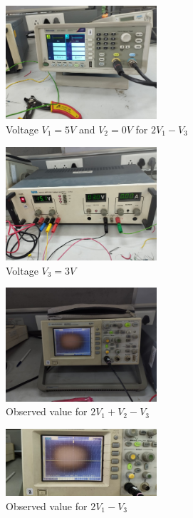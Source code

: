 \documentclass[a4paper,12pt]{article}
\begin{document}
\begin{figure}[H]
    \centering
    \includegraphics[width=0.5\textwidth]{figs/adderv1.png}
    \caption{Voltage $V_1 = 5V$ and $V_2 = 0V$ for $2V_1 - V_3$}
\end{figure}
\begin{figure}[H]
    \centering
    \includegraphics[width=0.5\textwidth]{figs/adderv3.png}
    \caption{Voltage $V_3 = 3V$}
\end{figure}

\begin{figure}[H]
    \centering
    \includegraphics[width=0.5\textwidth]{figs/addervalue2.png}
    \caption{Observed value for $2V_1 + V_2 - V_3$}
\end{figure}
\begin{figure}[H]
    \centering
    \includegraphics[width=0.5\textwidth]{figs/addervalue1.png}
    \caption{Observed value for $2V_1 - V_3$}
\end{figure}
\end{document}
